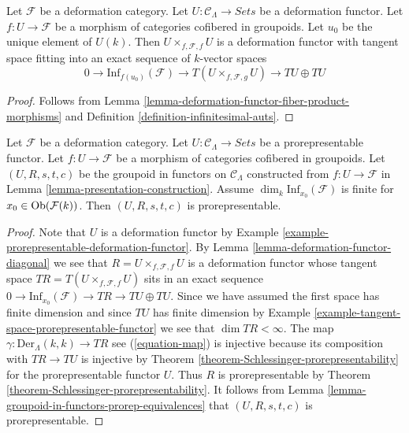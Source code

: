 \begin{lemma}
\label{lemma-deformation-functor-diagonal}
Let $\mathcal{F}$ be a deformation category.
Let $U : \mathcal{C}_\Lambda \to \textit{Sets}$ be a deformation functor.
Let $f: U \to \mathcal{F}$ be a morphism of categories cofibered in groupoids.
Let $u_0$ be the unique element of $U(k)$.
Then $U \times_{f, \mathcal{F}, f} U$ is a deformation functor
with tangent space fitting into an exact sequence of $k$-vector spaces
$$
0 \to \text{Inf}_{f(u_0)}(\mathcal{F}) \to
T(U \times_{f, \mathcal{F}, g} U) \to TU \oplus TU
$$
\end{lemma}

\begin{proof}
Follows from
Lemma \ref{lemma-deformation-functor-fiber-product-morphisms}
and
Definition \ref{definition-infinitesimal-auts}.
\end{proof}

\begin{lemma}
\label{lemma-prorepresentable-groupoid-in-functors-construction}
Let $\mathcal{F}$ be a deformation category.
Let $U : \mathcal{C}_\Lambda \to \textit{Sets}$ be a prorepresentable functor.
Let $f : U \to \mathcal{F}$ be a morphism of categories cofibered in groupoids.
Let $(U, R, s, t, c)$ be the groupoid in functors on $\mathcal{C}_\Lambda$
constructed from $f : U \to \mathcal{F}$ in
Lemma \ref{lemma-presentation-construction}. Assume
$\dim_k \text{Inf}_{x_0}(\mathcal{F})$ is finite for
$x_0 \in \mathop{\rm Ob}\nolimits(\mathcal{F}(k))$. Then $(U, R, s, t, c)$ is prorepresentable.
\end{lemma}

\begin{proof}
Note that $U$ is a deformation functor by
Example \ref{example-prorepresentable-deformation-functor}.
By
Lemma \ref{lemma-deformation-functor-diagonal}
we see that $R = U \times_{f, \mathcal{F}, f} U$
is a deformation functor whose tangent space
$TR = T(U \times_{f, \mathcal{F}, f} U)$ sits in an exact sequence
$0 \to \text{Inf}_{x_0}(\mathcal{F}) \to TR \to TU \oplus TU$.
Since we have assumed the first space has finite dimension and since
$TU$ has finite dimension by
Example \ref{example-tangent-space-prorepresentable-functor}
we see that $\dim TR < \infty$. The map
$\gamma : \text{Der}_\Lambda(k, k) \to TR$ see (\ref{equation-map})
is injective because its composition with $TR \to TU$ is injective by
Theorem \ref{theorem-Schlessinger-prorepresentability}
for the prorepresentable functor $U$. Thus $R$ is prorepresentable by
Theorem \ref{theorem-Schlessinger-prorepresentability}.
It follows from
Lemma \ref{lemma-groupoid-in-functors-prorep-equivalences}
that $(U, R, s, t, c)$ is prorepresentable.
\end{proof}

